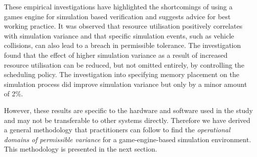\documentclass[letterpaper, 10 pt, journal, twoside]{IEEEtran}
\begin{document}
These empirical investigations have highlighted the shortcomings of using a games engine for simulation based verification and suggests advice for best working practice. 
%
It was observed that resource utilisation positively correlates with simulation variance and that specific simulation events, such as vehicle collisions, can also lead to a breach in permissible tolerance. 
%
The investigation found that the effect of higher simulation variance as a result of increased resource utilisation can be reduced, but not omitted entirely, by controlling the scheduling policy. 
%
The investigation into specifying memory placement on the simulation process did improve simulation variance but only by a minor amount of 2\%.

However, these results are specific to the hardware and software used in the study and may not be transferable to other systems directly. 
%
Therefore we have derived a general methodology that practitioners can follow to find the 
\textit{operational domains of permissible variance} 
for %
a game-engine-based simulation environment. This methodology is presented in the next section. 

\end{document}
